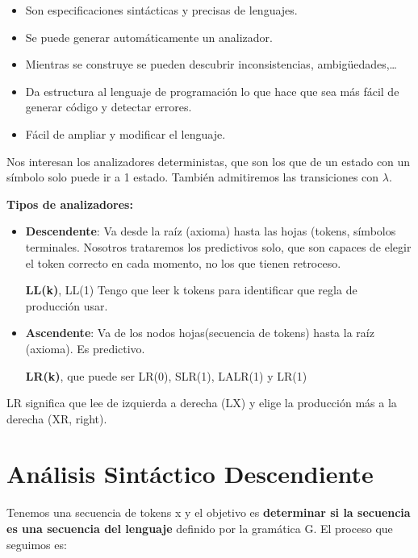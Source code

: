 \documentclass[12pt]{report} %
\begin{document}
\begin{itemize}

\item
  Son especificaciones sintácticas y precisas de lenguajes.
\item
  Se puede generar automáticamente un analizador.
\item
  Mientras se construye se pueden descubrir inconsistencias,
  ambigüedades,\ldots{}
\item
  Da estructura al lenguaje de programación lo que hace que sea más
  fácil de generar código y detectar errores.
\item
  Fácil de ampliar y modificar el lenguaje.
\end{itemize}

Nos interesan los analizadores deterministas, que son los que de un
estado con un símbolo solo puede ir a 1 estado. También admitiremos las
transiciones con \(\lambda\).

\textbf{Tipos de analizadores:}

\begin{itemize}
\item
  \textbf{Descendente}: Va desde la raíz (axioma) hasta las hojas
  (tokens, símbolos terminales. Nosotros trataremos los predictivos
  solo, que son capaces de elegir el token correcto en cada momento, no
  los que tienen retroceso.

  \textbf{LL(k)}, LL(1) Tengo que leer k tokens para identificar que
  regla de producción usar.
\item
  \textbf{Ascendente}: Va de los nodos hojas(secuencia de tokens) hasta
  la raíz (axioma). Es predictivo.

  \textbf{LR(k)}, que puede ser LR(0), SLR(1), LALR(1) y LR(1)
\end{itemize}

LR significa que lee de izquierda a derecha (LX) y elige la producción
más a la derecha (XR, right).

\section{Análisis Sintáctico Descendiente}

Tenemos una secuencia de tokens x y el objetivo es \textbf{determinar si
la secuencia es una secuencia del lenguaje} definido por la gramática G.
El proceso que seguimos es:
\end{document}
